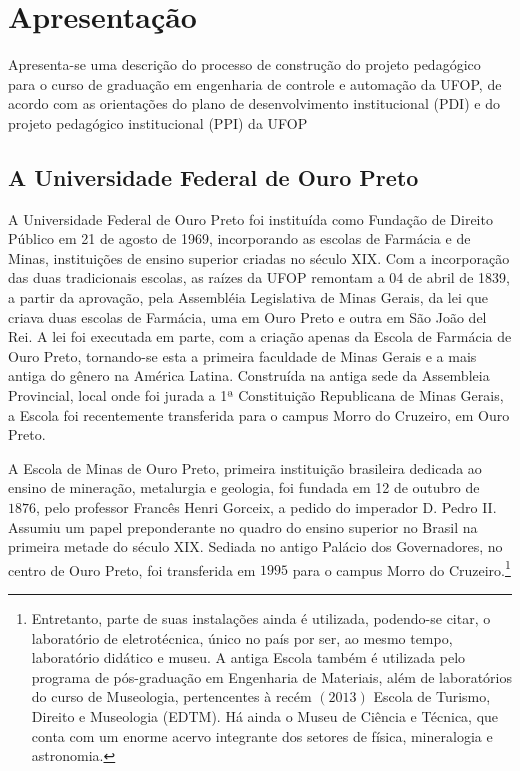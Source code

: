 \chapter{Apresenta{\c c}{\~a}o} 
\label{cap:introducao} 
Apresenta-se uma descri{\c c}{\~a}o do processo de constru{\c c}{\~a}o do projeto pedag{\'o}gico para o curso de gradua{\c c}{\~a}o em engenharia de controle e automa{\c c}{\~a}o da UFOP, de acordo com as orienta{\c c}{\~o}es do plano de desenvolvimento institucional (PDI) e do projeto pedagógico institucional (PPI) da UFOP \cite{manual-ppc-ufop}
\section{A Universidade Federal de Ouro Preto}\label{sec:contextualizacao}
A Universidade Federal de Ouro Preto foi instituída como Fundação de Direito Público em 21 de agosto de 1969, incorporando as escolas de Farmácia e de Minas, instituições de ensino superior criadas no século XIX. Com a incorporação das duas tradicionais escolas, as raízes da UFOP remontam a 04 de abril de 1839, a partir da aprovação, pela Assembléia Legislativa de Minas Gerais, da lei que criava duas escolas de Farmácia, uma em Ouro Preto e outra em São João del Rei. A lei foi executada em parte, com a criação apenas da Escola de Farmácia de Ouro Preto, tornando-se esta a primeira faculdade de Minas Gerais e a mais antiga do gênero na América Latina. Construída na antiga sede da Assembleia Provincial, local onde foi jurada a 1ª Constituição Republicana de Minas Gerais, a Escola foi recentemente transferida para o campus Morro do Cruzeiro, em Ouro Preto.

A Escola de Minas de Ouro Preto, primeira instituição brasileira dedicada ao ensino de mineração, metalurgia e geologia, foi fundada em 12 de outubro de $1876$, pelo professor Francês Henri Gorceix, a pedido do imperador D. Pedro II. Assumiu um papel preponderante no quadro do ensino superior no Brasil na primeira metade do século XIX. Sediada no antigo Palácio dos Governadores, no centro de Ouro Preto, foi transferida em $1995$ para o campus Morro do Cruzeiro.\footnote{Entretanto, parte de suas instalações ainda é utilizada, podendo-se citar, o laboratório de eletrotécnica, único no país por ser, ao mesmo tempo, laboratório didático e museu. A antiga Escola também é utilizada pelo programa de pós-graduação em Engenharia de Materiais, além de laboratórios do curso de Museologia, pertencentes à recém $(2013)$ Escola de Turismo, Direito e Museologia (EDTM). Há ainda o Museu de Ciência e Técnica, que conta com um enorme acervo integrante dos setores de física, mineralogia e astronomia.}

